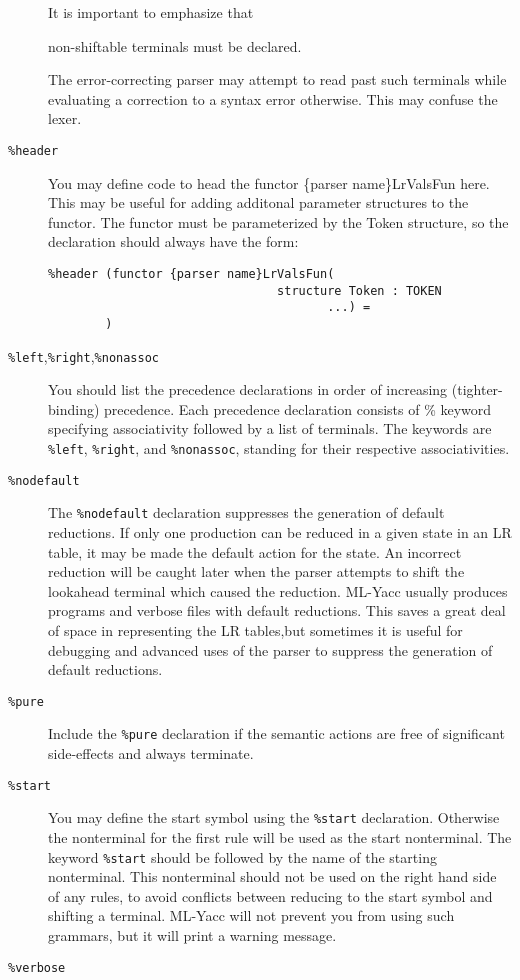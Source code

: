 \begin{description}
It is important to emphasize that
\begin{em}
non-shiftable terminals must be declared.
\end{em}
The error-correcting parser may attempt to read past such terminals
while evaluating a correction to a syntax error otherwise.  This may
confuse the lexer.
\item[{\tt \%header}]
\begin{samepage}
You may define code to head the functor \{parser name\}LrValsFun here.  This
may be useful for adding additonal parameter structures to the functor.
The functor must be parameterized by the Token structure, so
the declaration should always have the form:
\begin{tt}
\begin{verbatim}
%header (functor {parser name}LrValsFun(
                                structure Token : TOKEN
                                       ...) =
        )
\end{verbatim}
\end{tt}
\end{samepage}
\item[{\tt \%left},{\tt \%right},{\tt \%nonassoc}]
You should list the precedence declarations in order of increasing (tighter-binding)
 precedence.  Each precedence declaration consists
of \% keyword specifying associativity followed by a list of terminals.
The keywords are {\tt \%left}, {\tt \%right}, and {\tt \%nonassoc},
standing for their respective associativities.
\item[{\tt \%nodefault}]
The {\tt \%nodefault} declaration suppresses the generation of default
reductions.  If only one production can be reduced in a given state in
an LR table, it may be made the default action for the state.  An incorrect
reduction will be caught later when the parser attempts to shift the lookahead
terminal which caused the reduction. ML-Yacc usually produces programs and
verbose files with default reductions.  This saves a great deal of
space in representing the LR tables,but
sometimes it is useful for debugging and advanced
uses of the parser to suppress the generation of default reductions.
\item[{\tt \%pure}]
Include the {\tt \%pure} declaration if the semantic actions
are free of significant side-effects and always terminate.
\item[{\tt \%start}]
You may define the start symbol using
the {\tt \%start} declaration.  Otherwise the nonterminal for the
first rule will be used as the start nonterminal.
The keyword {\tt \%start} should be followed by the name of the starting
nonterminal.  This nonterminal should not be used on the right hand
side of any rules, to avoid conflicts between reducing to the start
symbol and shifting a terminal.  ML-Yacc will not prevent you
from using such grammars, but it will print a warning message.
\item[{\tt \%verbose}]


\end{description}

